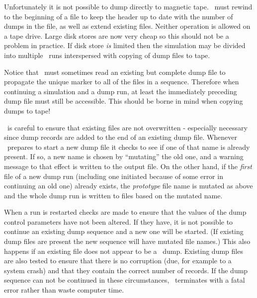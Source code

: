 Unfortunately it is not possible to dump directly to magnetic tape.  
\moldy\  must rewind to the beginning of a file to keep the
header up to date with the number of dumps in the file, as well as
extend existing files.  Neither operation is allowed on a tape drive.
Large disk stores are now very cheap so this should not be a problem
in practice.  If disk store {\em is} limited then the simulation may
be divided into multiple \moldy\  runs interspersed with copying of dump
files to tape.

Notice that \moldy\  must sometimes read an existing but complete dump
file to propagate the unique marker to all of the files in a sequence.
Therefore when continuing a simulation and a dump run, at least
the immediately preceding dump file must still be accessible.  This
should be borne in mind when copying dumps to tape!

\moldy\  is careful to ensure that existing files are not
overwritten - especially necessary since dump records are added to
the end of an existing dump file.  Whenever \moldy\  prepares to start a
new dump file it checks to see if one of that name is already present.
If so, a new name is chosen by ``mutating'' the old one, and a warning
message to that effect is written to the output file. On the other
hand, if the {\em first} file of a new dump run (including one
initiated because of some error in continuing an old one) already
exists, the {\em prototype} file name is mutated as above and the
whole dump run is written to files based on the mutated name.

When a run is restarted checks are made to ensure that the values of
the dump control parameters have not been altered.  If they
have, it is not possible to continue an existing dump sequence and a
new one will be started.  (If existing dump files are present the new
sequence will have mutated file names.)  This also happens if an
existing file does not appear to be a \moldy\  dump.  Existing dump
files are also tested to ensure that there is no corruption (due, for
example to a system crash) and that they contain the correct number of
records.  If the dump sequence can not be continued in these
circumstances, \moldy\  terminates with a fatal error rather than waste
computer time.



